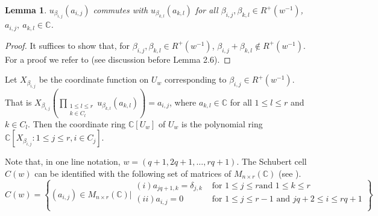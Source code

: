 \documentclass[12pt,reqno]{amsart}
\numberwithin{equation}{section}
\newtheorem{lemma}[theorem]{Lemma}
\theoremstyle{definition}
\begin{document}
 \begin{lemma}\label{remark 1.1}
 	$u_{\beta_{i,j}}(a_{i,j})$ commutes with $u_{\beta_{k,l}}(a_{k,l})$ for all $\beta_{i,j},\beta_{k,l}\in R^{+}(w^{-1})$, $a_{i,j},\ a_{k,l}\in\mathbb{C}$.
 \end{lemma}
\begin{proof} It suffices to show that, for $\beta_{i,j},\beta_{k,l}\in R^{+}(w^{-1})$, $\beta_{i,j}+\beta_{k,l}\notin R^{+}(w^{-1})$. For a proof we refer to \cite{sskannan} (see discussion before Lemma 2.6).
\end{proof}
Let $X_{\beta_{i,j}}$ be the coordinate function on $U_{w}$ corresponding to $\beta_{i,j}\in R^{+}(w^{-1})$. That is $X_{\beta_{i,j}}(\prod_{\substack{1\leq l\leq r\\k\in C_{l}}}u_{\beta_{k,l}}(a_{k,l}))=a_{i,j}$, where $a_{k,l}\in\mathbb{C}$ for all $1\leq l\leq r$ and $k\in C_{l}$. Then the coordinate ring $\mathbb{C}[U_{w}]$ of $U_{w}$ is the polynomial ring $\mathbb{C}[X_{\beta_{i,j}}:1\leq j\leq r, i\in C_{j}]$.

Note that, in one line notation, $w= (q+1,2q+1,\ldots,rq+1)$. 
The Schubert cell $C(w)$ can be identified with the following set of matrices of $M_{n\times r}(\mathbb{C})$ (see \cite[section 1.2.1]{Seshadri}).
\begin{equation}\label{eq 1.0}
	C(w)=
	\left\{
	(a_{i,j})\in M_{n\times r}(\mathbb{C})\Bigg\vert
	\begin{matrix}
		(i) a_{jq+1,k}=\delta_{j,k} &\text{ for $1\leq j\leq r$
			and $1\leq k\leq r$}\\ 
		(ii) a_{i,j}=0 &\text{ for $1\leq j\leq r-1$ and $jq+2\leq i\leq rq+1$} \\
	\end{matrix}
	\right\}
\end{equation}
\end{document}
